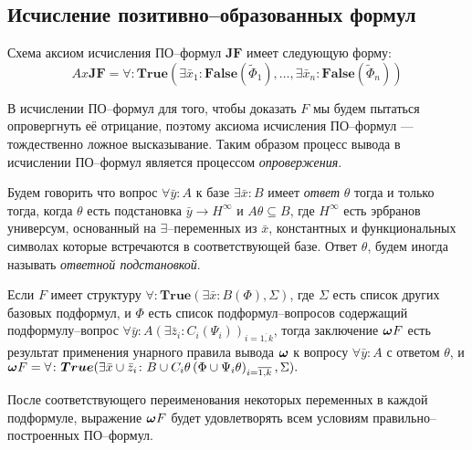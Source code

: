 \subsection{Исчисление позитивно--образованных формул}

Схема аксиом исчисления ПО--формул $\boldsymbol{JF}$ имеет следующую форму:
$$ Ax\boldsymbol{JF} = \forall\colon\boldsymbol{True}\left(\exists \bar{x}_1\colon\boldsymbol{False}\left(\widetilde{\Phi}_1\right),\ldots,\exists \bar{x}_n\colon\boldsymbol{False}\left(\widetilde{\Phi}_n\right)\right) $$

В исчислении ПО--формул для того, чтобы доказать $F$ мы будем пытаться опровергнуть её отрицание, поэтому аксиома исчисления ПО--формул ---  тождественно ложное высказывание. Таким образом процесс вывода в исчислении ПО--формул является процессом {\em опровержения}.

\begin{definition}
\label{ircond}
Будем говорить что вопрос $\forall \bar{y}\colon A$ к базе $\exists \bar{x}\colon B$ имеет {\em ответ} $\theta$  тогда и только тогда, когда $\theta$ есть подстановка $\bar{y} \rightarrow H^{\infty}$ и $A\theta \subseteq B$, где $H^{\infty}$ есть эрбранов универсум, основанный на $\exists$--переменных из $\bar{x}$, константных и функциональных символах которые встречаются в соответствующей базе. Ответ $\theta$, будем иногда называть {\em ответной подстановкой}.
\end{definition}


\begin{definition}
\label{omega}
Если $F$ имеет структуру $\forall\colon\boldsymbol{True}\left(\exists \bar{x}\colon B\left(\Phi\right),\Sigma\right)$, где $\Sigma$ есть список других базовых подформул, и $\Phi$ есть список подформул--вопросов содержащий подформулу--вопрос $\forall \bar{y}\colon A(\exists \bar{z}_i\colon C_i\left(\Psi_i\right))_{i=\overline{1,k}}$, тогда заключение $\boldsymbol{\omega} F$ есть результат применения унарного правила вывода $\boldsymbol{\omega}$ к вопросу $\forall \bar{y}\colon A$ с ответом $\theta$, и $\boldsymbol{\omega} F = \forall\colon\boldsymbol{True}(\exists \bar{x} \cup \bar{z}_i\colon B \cup C_i\theta\left(\Phi \cup \Psi_i\theta\right)_{i=\overline{1,k}},\Sigma).$

\end{definition}

После соответствующего переименования некоторых переменных в каждой подформуле, выражение $\boldsymbol{\omega} F$ будет удовлетворять всем условиям правильно--построенных ПО--формул.


